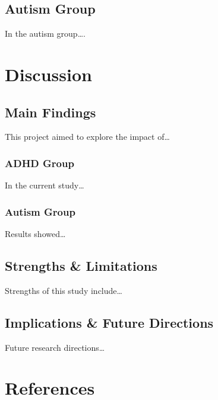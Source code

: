 \documentclass[
  letterpaper,
]{ut-thesis}
\begin{document}
\begin{landscape}
\begin{table}
{}

\end{table}%

\end{landscape}

\section{Autism Group}\label{autism-group}

In the autism group\ldots.


\chapter{Discussion}\label{discussion}

\section{Main Findings}\label{main-findings}

This project aimed to explore the impact of\ldots{}

\subsection{ADHD Group}\label{adhd-group-1}

In the current study\ldots{}

\subsection{Autism Group}\label{autism-group-1}

Results showed\ldots{}

\section{Strengths \& Limitations}\label{strengths-limitations}

Strengths of this study include\ldots{}

\section{Implications \& Future
Directions}\label{implications-future-directions}

Future research directions\ldots{}


\chapter*{References}\label{references}
\end{document}
